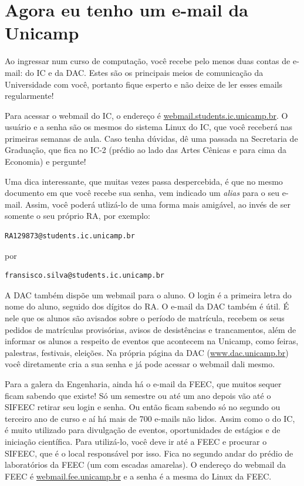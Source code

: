 
\section{Agora eu tenho um e-mail da Unicamp}

Ao ingressar num curso de computação, você recebe pelo menos duas contas de e-mail: do IC e da
DAC. Estes são os principais meios de comunicação da Universidade com você,
portanto fique esperto e não deixe de ler esses emails regularmente!

Para acessar o webmail do IC, o endereço é \url{webmail.students.ic.unicamp.br}.
O usuário e a senha são os mesmos do sistema Linux do IC, que você receberá nas
primeiras semanas de aula. Caso tenha dúvidas, dê uma passada na Secretaria de Graduação,
que fica no IC-2 (prédio ao lado das Artes Cênicas e para cima da Economia)
e pergunte!

Uma dica interessante, que muitas vezes passa
despercebida, é que no mesmo documento em que você recebe sua senha, vem indicado
um {\it alias} para o seu e-mail. Assim, você poderá utlizá-lo de
uma forma mais amigável, ao invés de ser somente o seu próprio RA, por 
exemplo:
\begin{verbatim}RA129873@students.ic.unicamp.br \end{verbatim} por 
\begin{verbatim}fransisco.silva@students.ic.unicamp.br \end{verbatim}

A DAC também dispõe um webmail para o aluno. O login é a primeira letra do nome
do aluno, seguido dos dígitos do RA. O e-mail da DAC também é útil. É nele que os
alunos são avisados sobre o período de matrícula, recebem os seus pedidos de
matrículas provisórias, avisos de desistências e trancamentos, além de informar
os alunos a respeito de eventos que acontecem na Unicamp, como feiras,
palestras, festivais, eleições. Na própria página da DAC
(\url{www.dac.unicamp.br}) você diretamente cria a sua senha e já pode
acessar o webmail dali mesmo.

Para a galera da Engenharia, ainda há o e-mail da FEEC, que muitos sequer ficam
sabendo que existe! Só um semestre ou até um ano depois vão até o SIFEEC retirar
seu login e senha. Ou então ficam sabendo só no segundo ou terceiro ano de curso
e aí há mais de 700 e-mails não lidos. Assim como o do IC, é muito
utilizado para divulgação de eventos, oportunidades de estágios e de iniciação
científica. Para utilizá-lo, você deve ir até a FEEC e procurar o SIFEEC, que
é o local responsável por isso. Fica no segundo andar do prédio de laboratórios
da FEEC (um com escadas amarelas). O endereço do webmail da FEEC
é \url{webmail.fee.unicamp.br} e a senha é a mesma do Linux da FEEC.

